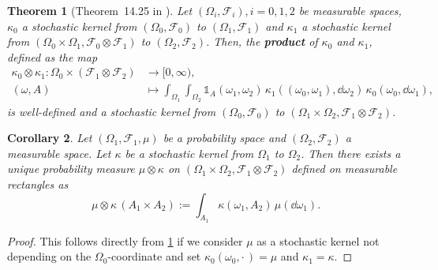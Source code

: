 \documentclass[
    a4paper,
    11pt,
    bibliography=totoc,
    listof=totoc,      
    headinclude=true,
    cleardoublepage=empty,
]{scrbook}
\theoremstyle{plain}
\newtheorem{theorem}{Theorem}[chapter]
\newtheorem{corollary}[theorem]{Corollary}
\theoremstyle{definition}
\theoremstyle{remark}
\begin{document}
\begin{theorem}[Theorem~14.25 in \cite{klenke2020_ptcc}]
\label{thm:ProductKernel}
    Let $(\Omega_i, \mathcal{F}_i), i=0,1,2$ be measurable spaces, $\kappa_0$
    a stochastic kernel from $(\Omega_0, \mathcal{F}_0)$ to $(\Omega_1,
    \mathcal{F}_1)$ and $\kappa_1$ a stochastic kernel from $(\Omega_0\times
    \Omega_1, \mathcal{F}_0\otimes\mathcal{F}_1)$ to $(\Omega_2,
    \mathcal{F}_2)$. Then, the \textbf{product} of
    $\kappa_0$ and $\kappa_1$, defined as the map
    \begin{equation}
    \label{eq:KernelProduct}
        \begin{split}
            \kappa_0 \otimes \kappa_1:
                \Omega_0 \times (\mathcal{F}_1\otimes\mathcal{F}_2) 
                    &\to 
                        [0,\infty), \\
            (\omega, A) 
                &\mapsto 
                    \int_{\Omega_1} \int_{\Omega_2} {
                        \mathds{1}_A(\omega_1, \omega_2) 
                        \,\kappa_1((\omega_0, \omega_1), \dd{\omega_2})
                        \,\kappa_0(\omega_0, \dd{\omega_1})
                    },
        \end{split}
    \end{equation}
    is well-defined and a stochastic kernel from $(\Omega_0, \mathcal{F}_0)$
    to $(\Omega_1\times\Omega_2, \mathcal{F}_1\otimes\mathcal{F}_2)$.
\end{theorem}

\begin{corollary}
\label{cor:MeasureKernelProduct}
    Let $(\Omega_1, \mathcal{F}_1, \mu)$ be a probability space and $(\Omega_2,
    \mathcal{F}_2)$ a measurable space. Let $\kappa$ be a stochastic kernel
    from $\Omega_1$ to $\Omega_2$. Then there exists a unique probability 
    measure $\mu \otimes \kappa$ on $(\Omega_1\times\Omega_2, \mathcal{F}_1
    \otimes \mathcal{F}_2)$ defined on measurable rectangles as
    \begin{equation}
        \mu\otimes\kappa\, (A_1\times A_2) := 
            \int_{A_1} \kappa(\omega_1, A_2) \,\mu(\dd{\omega_1}).
    \end{equation}
\end{corollary}
\begin{proof}
    This follows directly from \cref{thm:ProductKernel} if we consider $\mu$ 
    as a stochastic kernel not depending on the $\Omega_0$-coordinate and set 
    $\kappa_0(\omega_0, \cdot\,) = \mu$ and $\kappa_1 = \kappa$.
\end{proof}
\end{document}
